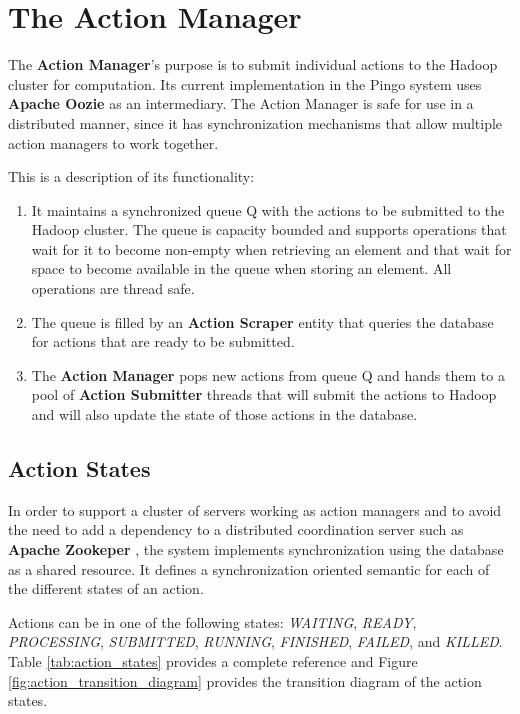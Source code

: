 \section{The Action Manager}
The \textbf{Action Manager}'s purpose is to submit individual actions to the Hadoop cluster for computation. Its current implementation in the Pingo system uses \textbf{Apache Oozie} \citep{islam2012oozie} as an intermediary. The Action Manager is safe for use in a distributed manner, since it has synchronization mechanisms that allow multiple action managers to work together.  

This is a description of its functionality:
\begin{enumerate}
\item It maintains a synchronized queue Q with the actions to be submitted to the Hadoop cluster. The queue is capacity bounded and supports operations that wait for it to become non-empty when retrieving an element and that wait for space to become available in the queue when storing an element. All operations are thread safe.
\item The queue is filled by an \textbf{Action Scraper} entity that queries the database for actions that are ready to be submitted.
\item The \textbf{Action Manager} pops new actions from queue Q and hands them to a pool of \textbf{Action Submitter} threads that will submit the actions to Hadoop and will also update the state of those actions in the database.
\end{enumerate}

\subsection{Action States}
In order to support a cluster of servers working as action managers and to avoid the need to add a dependency to a distributed coordination server such as \textbf{Apache Zookeper} \citep{zookeper}, the system implements synchronization using the database as a shared resource.  It defines a synchronization oriented semantic for each of the different states of an action.

Actions can be in one of the following states: \textit{WAITING}, \textit{READY}, \textit{PROCESSING}, \textit{SUBMITTED}, \textit{RUNNING}, \textit{FINISHED}, \textit{FAILED}, and \textit{KILLED}.  Table \ref{tab:action_states} provides a complete reference and Figure \ref{fig:action_transition_diagram} provides the transition diagram of the action states.

